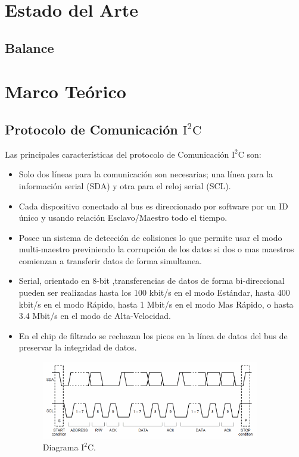 \documentclass[12pt,a4paper]{article}
\let\stdsection\section
\renewcommand\section{\newpage\stdsection}
\begin{document}
\section{Estado del Arte}
\subsection{Balance}



\section{Marco Te\'orico}

\subsection{Protocolo de Comunicación $\mathbf{\mathrm{I^2C}}$}

Las principales características del protocolo de Comunicación $\mathrm{I^2C}$ \cite{I2C} son:
\begin{itemize}
\item Solo dos líneas para la comunicación son necesarias; una línea para la información serial (SDA) y otra para el reloj serial (SCL).
\item Cada dispositivo conectado al bus es direccionado por software por un ID único y usando relación Esclavo/Maestro todo el tiempo.
\item Posee un sistema de detección de colisiones lo que permite usar el modo multi-maestro previniendo la corrupción de los datos si dos o mas maestros comienzan a transferir datos de forma simultanea.
\item Serial, orientado en 8-bit ,transferencias de datos de forma bi-direccional pueden ser realizadas hasta los 100 kbit/s en el modo Estándar, hasta 400 kbit/s en el modo Rápido, hasta 1 Mbit/s en el modo Mas Rápido, o hasta 3.4 Mbit/s en el modo de Alta-Velocidad.
\item En el chip de filtrado se rechazan los picos en la línea de datos del bus de preservar la integridad de datos.

\begin{figure}[H]
	\centering
  	\includegraphics[width=0.9\textwidth]{images/Diagrama_I2C}
    \caption{Diagrama $\mathrm{I^2C.}$}
	\label{fig:diagramaI2C}
\end{figure}
\end{itemize}
\end{document}
